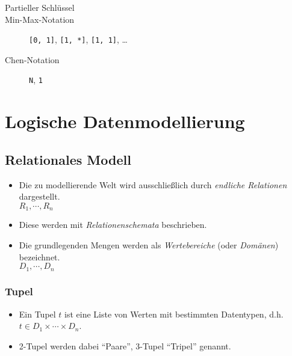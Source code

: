 \begin{description}
				\item[Partieller Schlüssel]
				\item[Min-Max-Notation] \texttt{[0, 1]}, \texttt{[1, *]}, \texttt{[1, 1]}, \dots
				\item[Chen-Notation] \texttt{N}, \texttt{1}
			\end{description}

\chapter{Logische Datenmodellierung} %
	\label{c:logicmodel}

	\section{Relationales Modell} %
		\begin{itemize}
			\item Die zu modellierende Welt wird ausschließlich durch \textit{endliche Relationen} dargestellt. \\ \( R _ 1, \cdots, R _ n \)
			\item Diese werden mit \textit{Relationenschemata} beschrieben.
			\item Die grundlegenden Mengen werden als \textit{Wertebereiche} (oder \textit{Domänen}) bezeichnet. \\ \( D _ 1, \cdots, D _ n \)
		\end{itemize}

		\subsection{Tupel} %
			\begin{itemize}
				\item Ein Tupel \(t\) ist eine Liste von Werten mit bestimmten Datentypen, d.h. \( t \in D _ 1 \times \cdots \times D _ n \).
				\item 2-Tupel werden dabei \enquote{Paare}, 3-Tupel \enquote{Tripel} genannt.
			\end{itemize}


